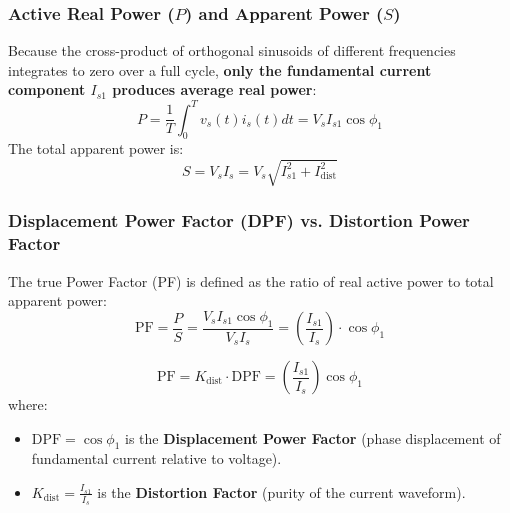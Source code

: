 \documentclass[11pt,a4paper]{article}
\begin{document}
\subsubsection{Active Real Power ($P$) and Apparent Power ($S$)}
Because the cross-product of orthogonal sinusoids of different frequencies integrates to zero over a full cycle, \textbf{only the fundamental current component $I_{s1}$ produces average real power}:
\begin{equation}
P = \frac{1}{T} \int_0^T v_s(t) i_s(t) dt = V_s I_{s1} \cos\phi_1
\end{equation}
The total apparent power is:
\begin{equation}
S = V_s I_s = V_s \sqrt{I_{s1}^2 + I_{\text{dist}}^2}
\end{equation}

\subsubsection{Displacement Power Factor (DPF) vs. Distortion Power Factor}
The true Power Factor (PF) is defined as the ratio of real active power to total apparent power:
\begin{equation}
\text{PF} = \frac{P}{S} = \frac{V_s I_{s1} \cos\phi_1}{V_s I_s} = \left(\frac{I_{s1}}{I_s}\right) \cdot \cos\phi_1
\end{equation}
\begin{formulabox}
\begin{equation}
\text{PF} = K_{\text{dist}} \cdot \text{DPF} = \left(\frac{I_{s1}}{I_s}\right) \cos\phi_1
\label{eq:true_pf}
\end{equation}
where:
\begin{itemize}[leftmargin=*]
  \item $\text{DPF} = \cos\phi_1$ is the \textbf{Displacement Power Factor} (phase displacement of fundamental current relative to voltage).
  \item $K_{\text{dist}} = \frac{I_{s1}}{I_s}$ is the \textbf{Distortion Factor} (purity of the current waveform).
\end{itemize}
\end{formulabox}
\end{document}
